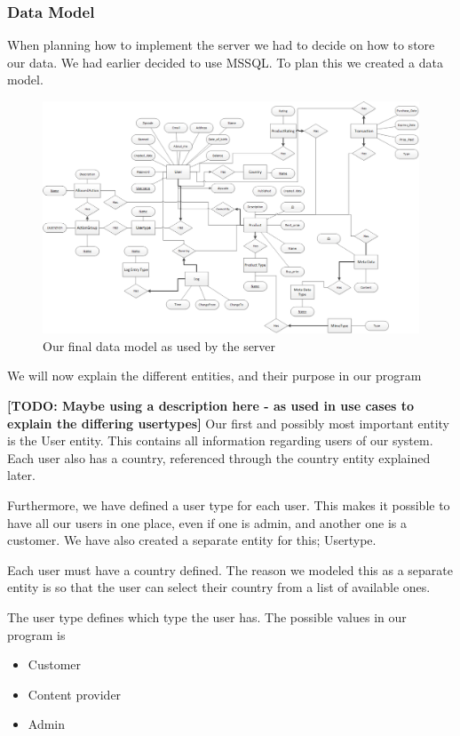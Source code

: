 \subsubsection{Data Model}
When planning how to implement the server we had to decide on how to store our data. We had earlier decided to use MSSQL. To plan this we created a data model.
\begin{figure}[t]
  \includegraphics[width=\textwidth]{illustrations/Datamodel.png}
  \caption{Our final data model as used by the server}
  \label{fig:datamodel}
\end{figure}
We will now explain the different entities, and their purpose in our program

\textbf{[TODO: Maybe using a description here - as used in use cases to explain the differing usertypes]}
Our first and possibly most important entity is the User entity. This contains all information regarding users of our system. Each user also has a country, referenced through the country entity explained later.

Furthermore, we have defined a user type for each user. This makes it possible to have all our users in one place, even if one is admin, and another one is a customer. We have also created a separate entity for this; Usertype.

Each user must have a country defined. The reason we modeled this as a separate entity is so that the user can select their country from a list of available ones.

The user type defines which type the user has. The possible values in our program is
\begin{itemize}
	\item Customer
	\item Content provider
	\item Admin
\end{itemize}

